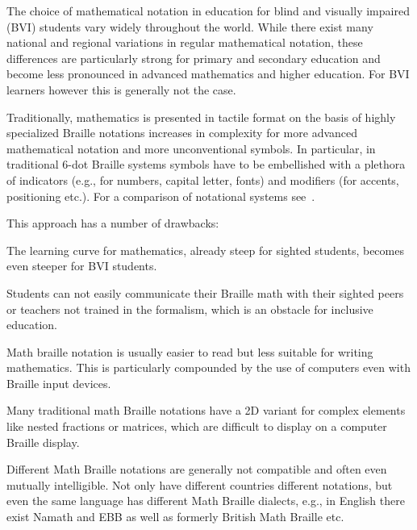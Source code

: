 \documentclass{article}
\begin{document}
The choice of mathematical notation in education for blind and visually impaired
(BVI) students vary widely throughout the world. While there exist many national
and regional variations in regular mathematical notation, these differences are
particularly strong for primary and secondary education and become less
pronounced in advanced mathematics and higher education. For BVI learners
however this is generally not the case.

Traditionally, mathematics is presented in tactile format on the basis of highly
specialized Braille notations increases in complexity for more advanced
mathematical notation and more unconventional symbols. In particular, in
traditional 6-dot Braille systems symbols have to be embellished with a plethora
of indicators (e.g., for numbers, capital letter, fonts) and modifiers (for
accents, positioning etc.). For a comparison of notational systems
see~\cite{van2022towards}.

This approach has a number of drawbacks: 
\begin{inparaenum}
\item The learning curve for mathematics, already steep for sighted students,
  becomes even steeper for BVI students.
\item Students can not easily communicate their Braille math with their sighted
  peers or teachers not trained in the formalism, which is an obstacle for
  inclusive education.
\item Math braille notation is usually easier to read but less suitable for
  writing mathematics. This is particularly compounded by the use of computers
  even with Braille input devices.
\item Many traditional math Braille notations have a 2D variant for complex
  elements like nested fractions or matrices, which are difficult to display on
  a computer Braille display.
\item Different Math Braille notations are generally not compatible and often
  even mutually intelligible. Not only have different countries different
  notations, but even the same language has different Math Braille dialects,
  e.g., in English there exist Namath and EBB as well as formerly British Math
  Braille etc.
\end{inparaenum}
\end{document}
